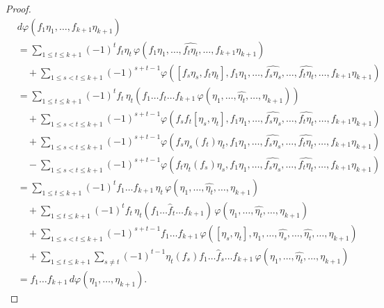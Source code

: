 \documentclass[12pt]{amsart}
\newcommand{\vphi}{{\varphi}}
\theoremstyle{definition}
\begin{document}
\begin{proof}
\begin{align*}
&d\vphi(f_1 \eta_1, \ldots, f_{k+1} \eta_{k+1}) \\
&= \sum_{1 \leq t \leq k+1} (-1)^t f_t \eta_t \, \vphi(f_1 \eta_1, \ldots, \widehat{f_t \eta_t}, \ldots, f_{k+1} \eta_{k+1}) \\
& \quad + \sum_{1 \leq s < t \leq k+1} (-1)^{s+t-1} \vphi( [f_s \eta_s, f_t \eta_t], f_1 \eta_1, \ldots, \widehat{f_s \eta_s}, \ldots, \widehat{f_t \eta_t}, \ldots, f_{k+1} \eta_{k+1}) \\
&= \sum_{1 \leq t \leq k+1} (-1)^t f_t \, \eta_t \left( f_1 \ldots \hat{f}_t \ldots f_{k+1} \, \vphi(\eta_1, \ldots, \widehat{\eta_t}, \ldots, \eta_{k+1}) \right)\\
& \quad + \sum_{1 \leq s < t \leq k+1} (-1)^{s+t-1} \vphi( f_s f_t [\eta_s, \eta_t], f_1 \eta_1, \ldots, \widehat{f_s \eta_s}, \ldots, \widehat{f_t \eta_t}, \ldots, f_{k+1} \eta_{k+1}) \\
& \quad + \sum_{1 \leq s < t \leq k+1} (-1)^{s+t-1} \vphi( f_s \eta_s(f_t) \eta_t, f_1 \eta_1, \ldots, \widehat{f_s \eta_s}, \ldots, \widehat{f_t \eta_t}, \ldots, f_{k+1} \eta_{k+1}) \\
& \quad - \sum_{1 \leq s < t \leq k+1} (-1)^{s+t-1} \vphi( f_t \eta_t(f_s) \eta_s, f_1 \eta_1, \ldots, \widehat{f_s \eta_s}, \ldots, \widehat{f_t \eta_t}, \ldots, f_{k+1} \eta_{k+1}) \\
&= \sum_{1 \leq t \leq k+1} (-1)^t f_1 \ldots f_{k+1} \, \eta_t \, \vphi(\eta_1, \ldots, \widehat{\eta_t}, \ldots, \eta_{k+1})\\
& \quad + \sum_{1 \leq t \leq k+1} (-1)^t f_t \,\eta_t (f_1 \ldots \hat{f}_t \ldots f_{k+1}) \, \vphi(\eta_1, \ldots, \widehat{\eta_t}, \ldots, \eta_{k+1})\\
& \quad + \sum_{1 \leq s < t \leq k+1} (-1)^{s+t-1} f_1 \ldots f_{k+1} \, \vphi( [\eta_s, \eta_t], \eta_1, \ldots, \widehat{\eta_s}, \ldots, \widehat{ \eta_t}, \ldots, \eta_{k+1}) \\
&\quad + \sum_{1 \leq t \leq k+1} \sum_{s \neq t} (-1)^{t-1} \eta_t (f_s) f_1 \ldots \hat{f}_s \ldots f_{k+1} \, \vphi(\eta_1, \ldots, \widehat{\eta_t}, \ldots, \eta_{k+1})\\
&= f_1 \ldots f_{k+1} \,d \vphi(\eta_1, \ldots, \eta_{k+1}).
\end{align*}    
\end{proof}
\end{document}
